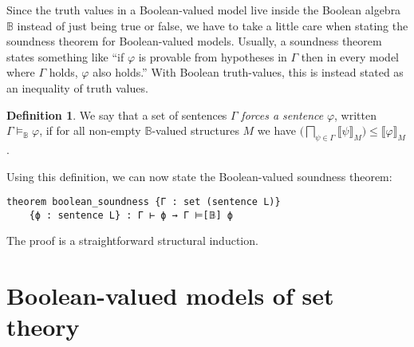 \documentclass[sigplan,10pt,review, anonymous]{acmart}
\newcommand{\B}{\mathbb{B}}
\theoremstyle{definition}
\newtheorem{defn}{Definition}[section]
\begin{document}
Since the truth values in a Boolean-valued model live inside the Boolean algebra $\B$ instead of just being true or false, we have to take a little care when stating the soundness theorem for Boolean-valued models.
Usually, a soundness theorem states something like ``if $\varphi$ is provable from hypotheses in $\Gamma$ then in every model where $\Gamma$ holds, $\varphi$ also holds.''
With Boolean truth-values, this is instead stated as an inequality of truth values. %
\begin{defn}
We say that a set of sentences $\Gamma$ \emph{forces a sentence} $\varphi$, written $\Gamma \models_{\B}\varphi$, if for all non-empty $\B$-valued structures $M$ we have $\big(\bigsqcap_{\psi\in\Gamma}\big \llbracket \psi \rrbracket_M)\le\llbracket \varphi \rrbracket_M$.
\end{defn}
Using this definition, we can now state the Boolean-valued soundness theorem: \label{boolean-soundness}
\begin{lstlisting}
theorem boolean_soundness {Γ : set (sentence L)}
    {ϕ : sentence L} : Γ ⊢ ϕ → Γ ⊨[𝔹] ϕ
\end{lstlisting}
The proof is a straightforward structural induction.

\section{Boolean-valued models of set theory}
\label{sect:bset}
\end{document}
